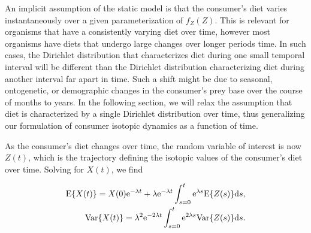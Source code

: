 \documentclass{frontiersSCNS}
\begin{document}





An implicit assumption of the static model is that the consumer's diet varies instantaneously over a given parameterization of $f_Z(Z)$.
This is relevant for organisms that have a consistently varying diet over time, however most organisms have diets that undergo large changes over longer periods time.
In such cases, the Dirichlet distribution that characterizes diet during one small temporal interval will be different than the Dirichlet distribution characterizing diet during another interval far apart in time.
Such a shift might be due to seasonal, ontogenetic, or demographic changes in the consumer's prey base over the course of months to years.
In the following section, we will relax the assumption that diet is characterized by a single Dirichlet distribution over time, thus generalizing our formulation of consumer isotopic dynamics as a function of time.

As the consumer's diet changes over time, the random variable of interest is now $Z(t)$, which is the trajectory defining the isotopic values of the consumer's diet over time.
Solving for $X(t)$, we find

\begin{align}
  \label{eqEVarZt}
{\rm E}\{X(t)\} = X(0){\rm e}^{-\lambda t} + \lambda{\rm e}^{-\lambda t} \int_{s=0}^t {\rm e}^{\lambda s} {\rm E}\{Z(s)\}{\rm d}s, \nonumber \\
{\rm Var}\{X(t)\} = \lambda^2 {\rm e}^{-2\lambda t} \int_{s=0}^t {\rm e}^{2\lambda s} {\rm Var}\{Z(s)\} {\rm d}s.
\end{align}



\end{document}
